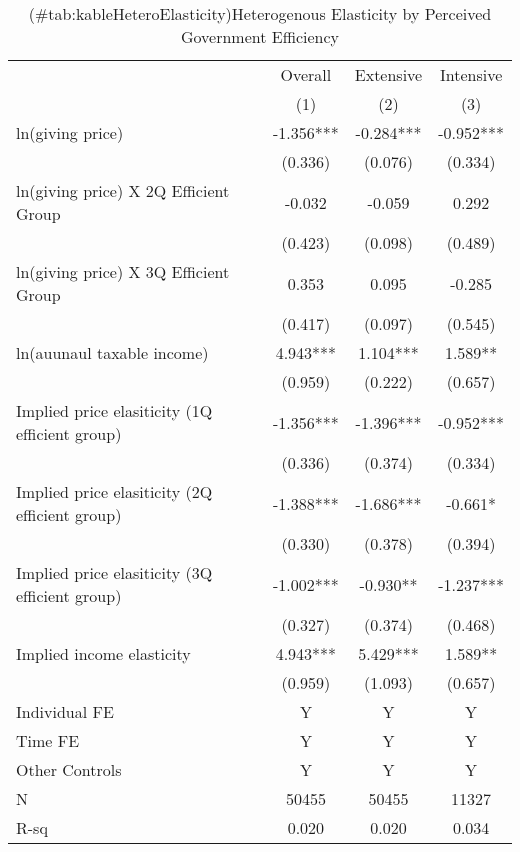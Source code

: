\documentclass[
]{article}
\begin{document}
\begin{table}

\caption{(\#tab:kableHeteroElasticity)Heterogenous Elasticity by Perceived Government Efficiency}
\centering
\fontsize{8}{10}\selectfont
\begin{threeparttable}
\begin{tabular}[t]{lccc}
\toprule
\multicolumn{1}{c}{ } & \multicolumn{1}{c}{Overall} & \multicolumn{1}{c}{Extensive} & \multicolumn{1}{c}{Intensive} \\
\cmidrule(l{3pt}r{3pt}){2-2} \cmidrule(l{3pt}r{3pt}){3-3} \cmidrule(l{3pt}r{3pt}){4-4}
 & (1) & (2) & (3)\\
\midrule
ln(giving price) & -1.356*** & -0.284*** & -0.952***\\
 & (0.336) & (0.076) & (0.334)\\
ln(giving price) X 2Q Efficient Group & -0.032 & -0.059 & 0.292\\
 & (0.423) & (0.098) & (0.489)\\
ln(giving price) X 3Q Efficient Group & 0.353 & 0.095 & -0.285\\
 & (0.417) & (0.097) & (0.545)\\
ln(auunaul taxable income) & 4.943*** & 1.104*** & 1.589**\\
 & (0.959) & (0.222) & (0.657)\\
Implied price elasiticity (1Q efficient group) & -1.356*** & -1.396*** & -0.952***\\
 & (0.336) & (0.374) & (0.334)\\
Implied price elasiticity (2Q efficient group) & -1.388*** & -1.686*** & -0.661*\\
 & (0.330) & (0.378) & (0.394)\\
Implied price elasiticity (3Q efficient group) & -1.002*** & -0.930** & -1.237***\\
 & (0.327) & (0.374) & (0.468)\\
Implied income elasticity & 4.943*** & 5.429*** & 1.589**\\
 & (0.959) & (1.093) & (0.657)\\
Individual FE & Y & Y & Y\\
Time FE & Y & Y & Y\\
Other Controls & Y & Y & Y\\
N & 50455 & 50455 & 11327\\
R-sq & 0.020 & 0.020 & 0.034\\
\bottomrule
\end{tabular}
\begin{tablenotes}

\end{tablenotes}
\end{threeparttable}
\end{table}
\end{document}
